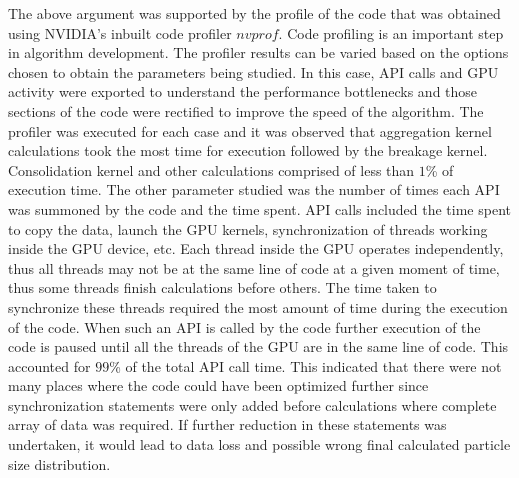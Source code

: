 \documentclass[preprint,10pt,authoryear,review]{elsarticle}
\begin{document}
\begin{linenumbers}
The above argument was supported by the profile of the code that was obtained using NVIDIA's
inbuilt code profiler $nvprof$. Code profiling is an important step in algorithm development. 
The profiler results can be varied based on the options chosen to obtain the parameters being 
studied. In this case, API calls and GPU activity were exported to understand the performance 
bottlenecks and those sections of the code were rectified to improve the speed of the algorithm.
The profiler was executed for each case and it was observed that aggregation kernel calculations 
took the most time for execution followed by the breakage kernel. Consolidation kernel 
and other calculations comprised of less than $1$\% of execution time. The other parameter 
studied was the number of times each API was summoned by the code and the time spent. API 
calls included the time spent to copy the data, launch the GPU kernels, synchronization of 
threads working inside the GPU device, etc. Each thread inside the GPU operates independently,
thus all threads may not be at the same line of code at a given moment of time, thus some threads 
finish calculations before others. The time taken to synchronize these threads required the most 
amount of time during the execution of the code. When such an API is called by the code 
further execution of the code is paused until all the threads of the GPU are in the same 
line of code. This accounted for $99$\% of the total API call time. This indicated that there 
were not many places where the code could have been optimized further since synchronization 
statements were only added before calculations where complete array of data was required. 
If further reduction in these statements was undertaken, it would lead to data loss and possible 
wrong final calculated particle size distribution.


\end{linenumbers}
\end{document}
